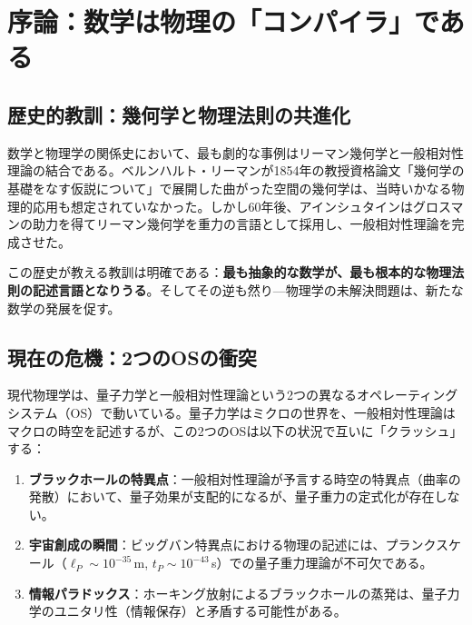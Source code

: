 \documentclass[12pt,a4paper]{ltjsarticle}
\theoremstyle{definition}
\begin{document}
\section{序論：数学は物理の「コンパイラ」である}

\subsection{歴史的教訓：幾何学と物理法則の共進化}

数学と物理学の関係史において、最も劇的な事例はリーマン幾何学と一般相対性理論の結合である。ベルンハルト・リーマンが1854年の教授資格論文「幾何学の基礎をなす仮説について」\cite{Riemann1854}で展開した曲がった空間の幾何学は、当時いかなる物理的応用も想定されていなかった。しかし60年後、アインシュタインはグロスマンの助力を得てリーマン幾何学を重力の言語として採用し、一般相対性理論を完成させた\cite{Einstein1915}。

この歴史が教える教訓は明確である：\textbf{最も抽象的な数学が、最も根本的な物理法則の記述言語となりうる}。そしてその逆も然り---物理学の未解決問題は、新たな数学の発展を促す。

\subsection{現在の危機：2つのOSの衝突}

現代物理学は、量子力学と一般相対性理論という2つの異なるオペレーティングシステム（OS）で動いている。量子力学はミクロの世界を、一般相対性理論はマクロの時空を記述するが、この2つのOSは以下の状況で互いに「クラッシュ」する：

\begin{enumerate}[leftmargin=2em]
  \item \textbf{ブラックホールの特異点}：一般相対性理論が予言する時空の特異点（曲率の発散）において、量子効果が支配的になるが、量子重力の定式化が存在しない\cite{Penrose1965, Hawking1970}。
  \item \textbf{宇宙創成の瞬間}：ビッグバン特異点における物理の記述には、プランクスケール（$\ell_P \sim 10^{-35}$\,m, $t_P \sim 10^{-43}$\,s）での量子重力理論が不可欠である。
  \item \textbf{情報パラドックス}：ホーキング放射によるブラックホールの蒸発は、量子力学のユニタリ性（情報保存）と矛盾する可能性がある\cite{Hawking1976}。
\end{enumerate}
\end{document}
